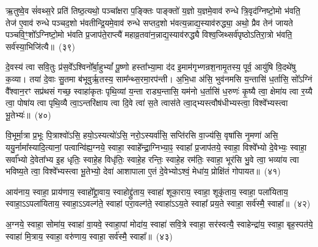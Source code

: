 ऋ॒तुष्वे॒व सं॑वथ्स॒रे प्रति॑ तिष्ठ॒त्यथो॒ पञ्चा᳚क्षरा प॒ङ्क्तिः पाङ्क्तो॑ य॒ज्ञो य॒ज्ञमे॒वाव॑ रुन्धे त्रि॒वृद॑ग्निष्टो॒मो भ॑वति॒ तेज॑ ए॒वाव॑ रुन्धे पञ्चद॒शो भ॑वतीन्द्रि॒यमे॒वाव॑ रुन्धे सप्तद॒शो भ॑वत्य॒न्नाद्य॒स्याव॑रुद्ध्या॒ अथो॒ प्रैव तेन॑ जायते पञ्चवि॒ꣳ॒शो᳚\-ऽग्निष्टो॒मो भ॑वति प्र॒जा\-प॑ते॒राप्त्यै॑ महाव्र॒तवा॑न॒न्नाद्य॒स्याव॑रुद्ध्यै विश्व॒जिथ्सर्व॑पृष्ठो\-ऽतिरा॒त्रो भ॑वति॒ सर्व॑स्या॒भिजि॑त्यै॥~(३९)\ip

{\anuvakamend[{ते व्याव॑र्तन्त प्रवदि॒ता स्या॒मिति॒ स ए॒तं प॑ञ्चरा॒त्रमा सं॑वथ्स॒रो॑\-ऽभिजि॑त्यै}]}%

दे॒वस्य॑ त्वा सवि॒तुः प्र॑स॒वे᳚\-ऽश्विनो᳚र्बा॒हु\-भ्यां᳚ पू॒ष्णो हस्ता᳚भ्या॒मा द॑द इ॒माम॑गृभ्णन्रश॒नामृ॒तस्य॒ पूर्व॒ आयु॑षि वि॒दथे॑षु क॒व्या। तया॑ दे॒वाः सु॒तमा ब॑भूवुर्\mbox{}ऋ॒तस्य॒ साम᳚न्थ्स॒रमा॒रप॑न्ती। अ॒भि॒धा अ॑सि॒ भुव॑नमसि य॒न्तासि॑ ध॒र्तासि॒ सो᳚\-ऽग्निं वै᳚श्वान॒रꣳ सप्र॑थसं गच्छ॒ स्वाहा॑कृतः पृथि॒व्यां य॒न्ता राड्य॒न्तासि॒ यम॑नो ध॒र्तासि॑ ध॒रुणः॑ कृ॒ष्यै त्वा॒ क्षेमा॑य त्वा र॒य्यै त्वा॒ पोषा॑य त्वा पृथि॒व्यै त्वा॒ऽन्तरि॑क्षाय त्वा दि॒वे त्वा॑ स॒ते त्वास॑ते त्वा॒द्भ्यस्त्वौष॑धीभ्यस्त्वा॒ विश्वे᳚भ्यस्त्वा भू॒तेभ्यः॑॥~(४०)\ip

{\anuvakamend[{ध॒रुणः॒ प़ञ्च॑विꣳशतिश्च}]}%

वि॒भूर्मा॒त्रा प्र॒भूः पि॒त्राश्वो॑\-ऽसि॒ हयो॒\-ऽस्यत्यो॑\-ऽसि॒ नरो॒\-ऽस्यर्वा॑सि॒ सप्ति॑रसि वा॒ज्य॑सि॒ वृषा॑सि नृ॒मणा॑ असि॒ ययु॒र्नामा᳚स्यादि॒त्यानां॒ पत्वान्वि॑ह्य॒ग्नये॒ स्वाहा॒ स्वाहे᳚न्द्रा॒ग्निभ्या॒ꣴ॒ स्वाहा᳚ प्र॒जा\-प॑तये॒ स्वाहा॒ विश्वे᳚भ्यो दे॒वेभ्यः॒ स्वाहा॒ सर्वा᳚भ्यो दे॒वेता᳚भ्य इ॒ह धृतिः॒ स्वाहे॒ह विधृ॑तिः॒ स्वाहे॒ह रन्तिः॒ स्वाहे॒ह रम॑तिः॒ स्वाहा॒ भूर॑सि भु॒वे त्वा॒ भव्या॑य त्वा भविष्य॒ते त्वा॒ विश्वे᳚भ्यस्त्वा भू॒तेभ्यो॒ देवा॑ आशापाला ए॒तं दे॒वेभ्यो\-ऽश्वं॒ मेधा॑य॒ प्रोक्षि॑तं गोपायत॥~(४१)\ip

{\anuvakamend[{रन्तिः॒ स्वाहा॒ द्वाविꣳ॑शतिश्च}]}%

आय॑नाय॒ स्वाहा॒ प्राय॑णाय॒ स्वाहो᳚द्द्रा॒वाय॒ स्वाहोद्द्रु॑ताय॒ स्वाहा॑ शूका॒राय॒ स्वाहा॒ शूकृ॑ताय॒ स्वाहा॒ पला॑यिताय॒ स्वाहा॒\-ऽऽ\-पला॑यिताय॒ स्वाहा॒\-ऽऽ\-वल्ग॑ते॒ स्वाहा॑ परा॒वल्ग॑ते॒ स्वाहा॑\-ऽऽ\-य॒ते स्वाहा᳚ प्रय॒ते स्वाहा॒ सर्व॑स्मै॒ स्वाहा᳚॥~(४२)\ip

{\anuvakamend[{आय॑ना॒योत्त॑रमा॒पला॑यिताय॒ षड्विꣳ॑शतिः}]}%

अ॒ग्नये॒ स्वाहा॒ सोमा॑य॒ स्वाहा॑ वा॒यवे॒ स्वाहा॒पां मोदा॑य॒ स्वाहा॑ सवि॒त्रे स्वाहा॒ सर॑स्वत्यै॒ स्वाहेन्द्रा॑य॒ स्वाहा॒ बृह॒स्पत॑ये॒ स्वाहा॑ मि॒त्राय॒ स्वाहा॒ वरु॑णाय॒ स्वाहा॒ सर्व॑स्मै॒ स्वाहा᳚॥~(४३)\ip

